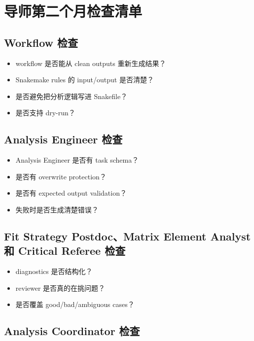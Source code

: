 \documentclass[11pt,a4paper,fontset=none]{ctexart}
\begin{document}
\section{导师第二个月检查清单}

\subsection{Workflow 检查}

\begin{itemize}[leftmargin=2em]
  \item workflow 是否能从 clean outputs 重新生成结果？
  \item Snakemake rules 的 input/output 是否清楚？
  \item 是否避免把分析逻辑写进 Snakefile？
  \item 是否支持 dry-run？
\end{itemize}

\subsection{Analysis Engineer 检查}

\begin{itemize}[leftmargin=2em]
  \item Analysis Engineer 是否有 task schema？
  \item 是否有 overwrite protection？
  \item 是否有 expected output validation？
  \item 失败时是否生成清楚错误？
\end{itemize}

\subsection{Fit Strategy Postdoc、Matrix Element Analyst 和 Critical Referee 检查}

\begin{itemize}[leftmargin=2em]
  \item diagnostics 是否结构化？
  \item reviewer 是否真的在挑问题？
  \item 是否覆盖 good/bad/ambiguous cases？
\end{itemize}

\subsection{Analysis Coordinator 检查}
\end{document}
